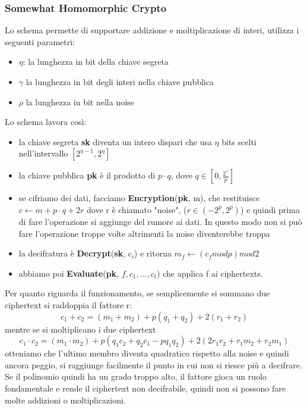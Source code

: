 \documentclass[12pt, oneside]{extbook} %
\begin{document}
\subsubsection{Somewhat Homomorphic Crypto}
Lo schema permette di supportare addizione e moltiplicazione di interi, utilizza i seguenti parametri:
\begin{itemize}
	\item $\eta$: la lunghezza in bit della chiave segreta
	\item $\gamma$ la lunghezza in bit degli interi nella chiave pubblica
	\item $\rho$ la lunghezza in bit nella noise
\end{itemize}
Lo schema lavora così:
\begin{itemize}
	\item la chiave segreta \textbf{sk} diventa un intero dispari che usa $\eta$ bits scelti nell'intervallo $[2^{\eta -1}, 2^{\eta}]$
	\item la chiave pubblica \textbf{pk} è il prodotto di $p \cdot q$, dove $q \in [0, \frac{2^{\gamma}}{p}]$
	\item se cifriamo dei dati, facciamo \textbf{Encryption}(\textbf{pk}, m), che restituisce $c \leftarrow m + p \cdot q + 2r$ dove r è chiamato "noise", ($r \in (-2^p, 2^p)$) e quindi prima di fare l'operazione si aggiunge del rumore ai dati. In questo modo non si può fare l'operazione troppe volte altrimenti la noise diventerebbe troppa
	\item la decifratura è \textbf{Decrypt}(\textbf{sk}, $c_i$) e ritorna $m_f \leftarrow (c_f mod p)mod2$
	\item abbiamo poi \textbf{Evaluate}(\textbf{pk}, $f, c_1,..., c_t$) che applica f ai ciphertexts.
\end{itemize}
Per quanto riguarda il funzionamento, se semplicemente si sommano due ciphertext si raddoppia il fattore r:
\begin{equation}
	c_1 + c_2 = (m_1 + m_2) +p(q_1 + q_2) +2(r_1 + r_2)
\end{equation}
mentre se si moltiplicano i due ciphertext 
\begin{equation}
	c_1 \cdot c_2 = (m_1\cdot m_2) +p(q_1c_2 + q_2c_1 -pq_1q_2) +2(2r_1r_2 + r_1m_2 + r_2m_1)
\end{equation}
otteniamo che l'ultimo membro diventa quadratico rispetto alla noise e quindi ancora peggio, si raggiunge facilmente il punto in cui non si riesce più a decifrare.\\Se il polinomio quindi ha un grado troppo alto, il fattore gioca un ruolo fondamentale e rende il ciphertext non decifrabile, quindi non si possono fare molte addizioni o moltiplicazioni.
\end{document}
